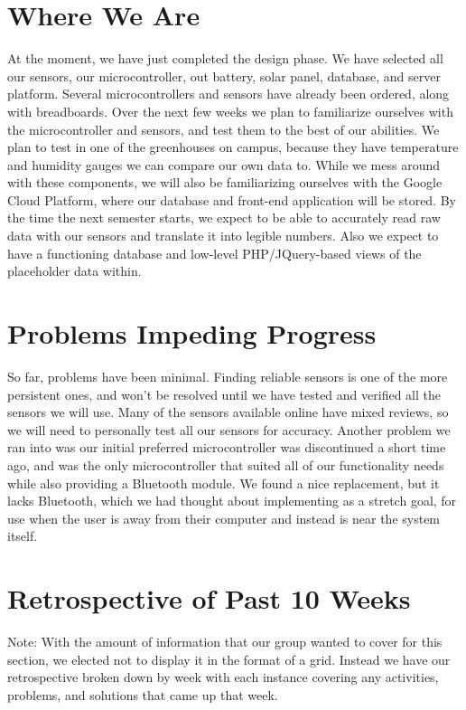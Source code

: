\documentclass[IEEEtran,letterpaper,10pt,titlepage,fleqn,draftclsnofoot,onecolumn]{article}
\begin{document}
\section{Where We Are}

At the moment, we have just completed the design phase. We have selected all our sensors, our microcontroller, out battery, solar panel, database, and server platform. Several microcontrollers and sensors have already been ordered, along with breadboards. Over the next few weeks we plan to familiarize ourselves with the microcontroller and sensors, and test them to the best of our abilities. We plan to test in one of the greenhouses on campus, because they have temperature and humidity gauges we can compare our own data to. While we mess around with these components, we will also be familiarizing ourselves with the Google Cloud Platform, where our database and front-end application will be stored. By the time the next semester starts, we expect to be able to accurately read raw data with our sensors and translate it into legible numbers. Also we expect to have a functioning database and low-level PHP/JQuery-based views of the placeholder data within. 

\section{Problems Impeding Progress}

So far, problems have been minimal. Finding reliable sensors is one of the more persistent ones, and won’t be resolved until we have tested and verified all the sensors we will use. Many of the sensors available online have mixed reviews, so we will need to personally test all our sensors for accuracy. Another problem we ran into was our initial preferred microcontroller was discontinued a short time ago, and was the only microcontroller that suited all of our functionality needs while also providing a Bluetooth module. We found a nice replacement, but it lacks Bluetooth, which we had thought about implementing as a stretch goal, for use when the user is away from their computer and instead is near the system itself. 

\section{Retrospective of Past 10 Weeks}

Note: With the amount of information that our group wanted to cover for this section, we elected not to display it in the format of a grid. Instead we have our retrospective broken down by week with each instance covering any activities, problems, and solutions that came up that week.
\end{document}
